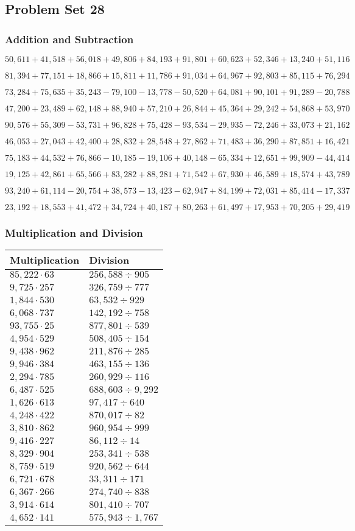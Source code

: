 \hypertarget{problem-set-28-4}{%
\subsection{Problem Set 28}\label{problem-set-28-4}}

\hypertarget{addition-and-subtraction-250}{%
\subsubsection{Addition and
Subtraction}\label{addition-and-subtraction-250}}

\(50,611+41,518+56,018+49,806+84,193+91,801+60,623+52,346+13,240+ 51,116\)

\(81,394+77,151+18,866+15,811+11,786+91,034+64,967+92,803+85,115+76,294\)

\(73,284+75,635+35,243-79,100-13,778-50,520+64,081+90,101+91,289-20,788\)

\(47,200+23,489+62,148+88,940+57,210+26,844+45,364+29,242+54,868+53,970\)

\(90,576+55,309-53,731+96,828+75,428-93,534-29,935-72,246+33,073+21,162\)

\(46,053+27,043+42,400+28,832+28,548+27,862+71,483+36,290+87,851+16,421\)

\(75,183+44,532+76,866-10,185-19,106+40,148-65,334+12,651+99,909-44,414\)

\(19,125+42,861+65,566+83,282+88,281+71,542+67,930+46,589+18,574+43,789\)

\(93,240+61,114-20,754+38,573-13,423-62,947+84,199+72,031+85,414-17,337\)

\(23,192+18,553+41,472+34,724+40,187+80,263+61,497+17,953+70,205+29,419\)

\hypertarget{multiplication-and-division-249}{%
\subsubsection{Multiplication and
Division}\label{multiplication-and-division-249}}

\begin{longtable}[]{@{}ll@{}}
\toprule
Multiplication & Division\tabularnewline
\midrule
\endhead
\(85,222\cdot63\) & \(256,588÷905\)\tabularnewline
\(9,725\cdot257\) & \(326,759÷777\)\tabularnewline
\(1,844\cdot530\) & \(63,532÷929\)\tabularnewline
\(6,068\cdot737\) & \(142,192÷758\)\tabularnewline
\(93,755\cdot25\) & \(877,801÷539\)\tabularnewline
\(4,954\cdot529\) & \(508,405÷154\)\tabularnewline
\(9,438\cdot962\) & \(211,876÷285\)\tabularnewline
\(9,946\cdot384\) & \(463,155÷136\)\tabularnewline
\(2,294\cdot785\) & \(260,929÷116\)\tabularnewline
\(6,487\cdot525\) & \(688,603÷9,292\)\tabularnewline
\(1,626\cdot613\) & \(97,417÷640\)\tabularnewline
\(4,248\cdot422\) & \(870,017÷82\)\tabularnewline
\(3,810\cdot862\) & \(960,954÷999\)\tabularnewline
\(9,416\cdot227\) & \(86,112÷14\)\tabularnewline
\(8,329\cdot904\) & \(253,341÷538\)\tabularnewline
\(8,759\cdot519\) & \(920,562÷644\)\tabularnewline
\(6,721\cdot678\) & \(33,311÷171\)\tabularnewline
\(6,367\cdot266\) & \(274,740÷838\)\tabularnewline
\(3,914\cdot614\) & \(801,410÷707\)\tabularnewline
\(4,652\cdot141\) & \(575,943÷1,767\)\tabularnewline
\bottomrule
\end{longtable}


